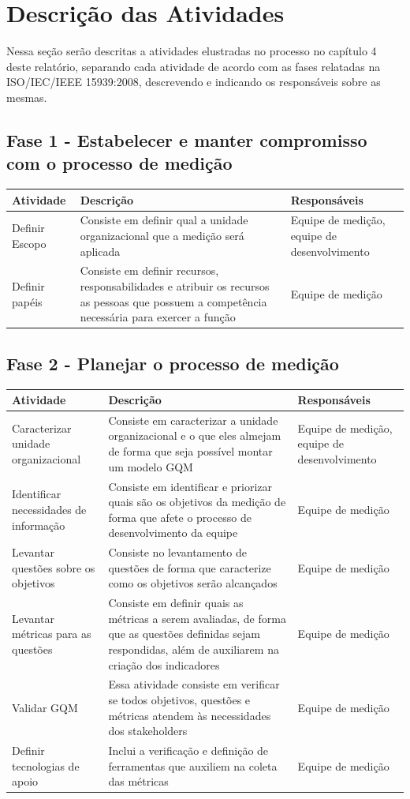 \section{Descrição das Atividades}

Nessa seção serão descritas a atividades elustradas no processo no capítulo 4 deste relatório, separando cada atividade de acordo com as fases relatadas na ISO/IEC/IEEE 15939:2008, descrevendo e indicando os responsáveis sobre as mesmas.

\subsection{Fase 1 - Estabelecer e manter compromisso com o processo de medição}
	\begin{tabular}{ |p{4cm}|p{6cm}| p{3cm} |}
	 \hline
	 Atividade 		& 		Descrição & Responsáveis \\
	 \hline
	 	Definir Escopo & Consiste em definir qual a unidade organizacional que a medição será aplicada &  Equipe de medição, equipe de desenvolvimento \\
	 \hline
	 	Definir papéis & Consiste em definir recursos, responsabilidades e atribuir os recursos as pessoas que possuem a competência necessária para exercer a função & Equipe de medição \\
	 \hline
	\end{tabular}


\subsection{Fase 2 - Planejar o processo de medição}

	\begin{tabular}{ |p{4cm}|p{6cm}| p{3cm} |}
	 \hline
	 Atividade 		& 		Descrição & Responsáveis \\
	 \hline
	 	Caracterizar unidade organizacional & Consiste em caracterizar a unidade organizacional e o que eles almejam de forma que seja possível montar um modelo GQM &  Equipe de medição, equipe de desenvolvimento \\
	 \hline
	 	Identificar necessidades de informação & Consiste em identificar e priorizar quais são os objetivos da medição de forma que afete o processo de desenvolvimento da equipe &  Equipe de medição \\
	 \hline
	 	Levantar questões sobre os objetivos & Consiste no levantamento de questões de forma que caracterize como os objetivos serão alcançados &  Equipe de medição \\
	 \hline
	 Levantar métricas para as questões & Consiste em definir quais as métricas a serem avaliadas, de forma que as questões definidas sejam respondidas, além de auxiliarem na criação dos indicadores &  Equipe de medição \\
	 \hline
	 Validar GQM & Essa atividade consiste em verificar se todos objetivos, questões e métricas atendem às necessidades dos stakeholders &  Equipe de medição \\
	 \hline
	 Definir tecnologias de apoio & Inclui a verificação e definição de ferramentas que auxiliem na coleta das métricas &  Equipe de medição \\
	 \hline
	\end{tabular}

